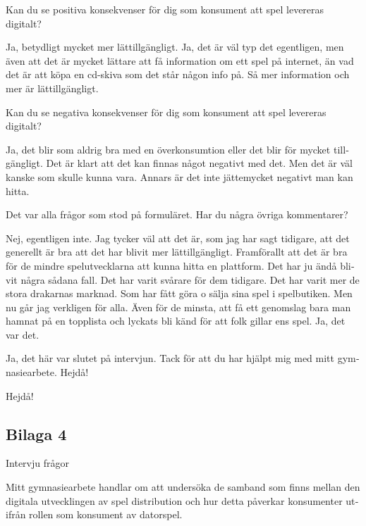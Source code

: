 \documentclass[11p]{article}
\begin{document}
\begin{otherlanguage}{swedish}
    \setlength{\leftskip}{0cm}
    Kan du se positiva konsekvenser för dig som konsument att spel levereras digitalt?

    \setlength{\leftskip}{1cm}
    Ja, betydligt mycket mer lättillgängligt.
    Ja, det är väl typ det egentligen, men även att det är mycket lättare att få information om ett spel på internet, än vad det är att köpa en cd-skiva som det står någon info på.
    Så mer information och mer är lättillgängligt.



    \setlength{\leftskip}{0cm}
    Kan du se negativa konsekvenser för dig som konsument att spel levereras digitalt?


    \setlength{\leftskip}{1cm}
    Ja, det blir som aldrig bra med en överkonsumtion eller det blir för mycket tillgängligt. Det är klart att det kan finnas något negativt med det. Men det är väl kanske  som skulle kunna vara.
    Annars är det inte jättemycket negativt man kan hitta.



    \setlength{\leftskip}{0cm}
    Det var alla frågor som stod på formuläret. Har du några övriga kommentarer?


    \setlength{\leftskip}{1cm}
    Nej, egentligen inte. Jag tycker väl att det är, som jag har sagt tidigare, att det generellt är bra att det har blivit mer lättillgängligt.
    Framförallt att det är bra för de mindre spelutvecklarna att kunna hitta en plattform. Det har ju ändå blivit några sådana fall.
    Det har varit svårare för dem tidigare. Det har varit mer de stora drakarnas marknad. Som har fått göra o sälja sina spel i spelbutiken.
    Men nu går jag verkligen för alla. Även för de minsta, att få ett genomslag  bara man hamnat på en topplista och lyckats bli känd för att folk gillar ens spel. Ja, det var det.



    \setlength{\leftskip}{0cm}
    Ja, det här var slutet på intervjun.
    Tack för att du har hjälpt mig med mitt gymnasiearbete. Hejdå!



    \setlength{\leftskip}{1cm}
    Hejdå!



    \subsection{Bilaga 4}
        Intervju frågor

        Mitt gymnasiearbete handlar om att undersöka de samband som finns mellan den digitala utvecklingen av spel distribution och hur detta påverkar konsumenter utifrån rollen som konsument av datorspel.


\end{otherlanguage}
\end{document}
